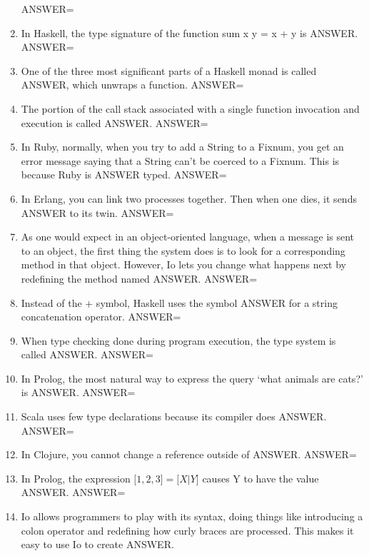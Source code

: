 \documentclass{exam}
\begin{document}
\begin{enumerate}
ANSWER=
\item In Haskell, the type signature of the function sum x y = x + y is ANSWER.\newline
ANSWER=
\item One of the three most significant parts of a Haskell monad is called ANSWER, which unwraps a function.\newline
ANSWER=
\item The portion of the call stack associated with a single function invocation and execution is called ANSWER.\newline
ANSWER=
\item In Ruby, normally, when you try to add a String to a Fixnum, you get an error message saying that a String can't be coerced to a Fixnum.  This is because Ruby is ANSWER typed.\newline
ANSWER=
\item In Erlang, you can link two processes together.  Then when one dies, it sends ANSWER to its twin.\newline
ANSWER=
\item As one would expect in an object-oriented language, when a message is sent to an object, the first thing the system does is to look for a corresponding method in that object.  However, Io lets you change what happens next by redefining the method named ANSWER.\newline
ANSWER=
\item Instead of the +  symbol, Haskell uses the symbol ANSWER for a string concatenation operator.\newline
ANSWER=
\item When type checking done during program execution, the type system is called ANSWER.\newline
ANSWER=
\item In Prolog, the most natural way to express the query `what animals are cats?' is ANSWER.\newline
ANSWER=
\item Scala uses few type declarations because its compiler does ANSWER.\newline
ANSWER=
\item In Clojure, you cannot change a reference outside of ANSWER.\newline
ANSWER=
\item In Prolog, the expression $\lbrack 1, 2, 3\rbrack = \lbrack X | Y\rbrack$ causes Y to have the value ANSWER.\newline
ANSWER=
\item Io allows programmers to play with its syntax, doing things like introducing a colon operator and redefining how curly braces are processed.  This makes it easy to use Io to create ANSWER.\newline

\end{enumerate}
\end{document}
